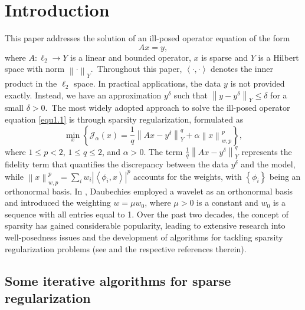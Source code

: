 \documentclass[a4paper,12pt]{article}
\numberwithin{equation}{section}
\begin{document}
\section{Introduction}\label{sec1}

\par This paper addresses the solution of an ill-posed operator equation of the form
\begin{equation}\label{equ1.1}
    Ax=y,
\end{equation}
where $A:\ell_{2}\rightarrow Y$ is a linear and bounded operator, $x$ is sparse and $Y$ is a Hilbert space with norm $\left\|\cdot\right\|_{Y}$.\ Throughout this paper, $\left<\cdot,\cdot\right>$ denotes the inner product in the $\ell_{2}$ space. In practical applications, the data $y$ is not provided exactly. Instead, we have an approximation $y^{\delta}$ such that $\left\|y-y^{\delta}\right\|_{Y}\leq\delta$ for a small $\delta >0$.\ The most widely adopted approach to solve the ill-posed operator equation \eqref{equ1.1} is through sparsity regularization, formulated as
\begin{equation}\label{equ1.2}
    \min_{x}\left\{\mathcal{J}_{\alpha}\left(x\right)=\frac{1}{q}\left\|Ax-y^{\delta}\right\|_{Y}^{q}+ \alpha\left\|x\right\|_{w,p}^{p}\right\},
\end{equation}
where $1\leq p<2$, $1\leq q\leq 2$, and $\alpha>0$. The term $\frac{1}{q}\left\|Ax-y^{\delta}\right\|_{Y}^{q}$ represents the fidelity term that quantifies the discrepancy between the data $y^{\delta}$ and the model, while $\left\|x\right\|_{w,p}^{p}=\sum_{i}w_{i}\left|\left<\phi_{i},x\right>\right|^{p}$ accounts for the weights, with $\left\{\phi_{i}\right\}$  being an orthonormal basis. In \cite{DDD04}, Daubechies employed a wavelet as an orthonormal basis and introduced the weighting $w=\mu w_{0}$, where $\mu>0$ is a constant and $w_{0}$ is a sequence with all entries equal to 1. Over the past two decades, the concept of sparsity has gained considerable popularity, leading to extensive research into well-posedness issues and the development of algorithms for tackling sparsity regularization problems (see \cite{F10,GL12,JM12} and the respective references therein).

\subsection{Some iterative algorithms for sparse regularization}
\end{document}
